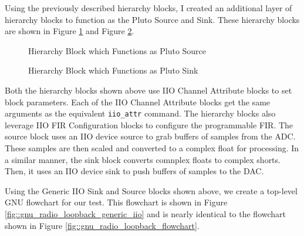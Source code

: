 \documentclass{article}
\begin{document}
Using the previously described hierarchy blocks, I created an additional layer of hierarchy blocks to function as the Pluto Source and Sink. These hierarchy blocks are shown in Figure \ref{fig::pluto_iio_device_source} and Figure \ref{fig::pluto_iio_device_sink}.

\begin{figure}[H]
	\centerline{}
	\caption{Hierarchy Block which Functions as Pluto Source}
	\label{fig::pluto_iio_device_source}
\end{figure}

\begin{figure}[H]
	\centerline{}
	\caption{Hierarchy Block which Functions as Pluto Sink}
	\label{fig::pluto_iio_device_sink}
\end{figure}

Both the hierarchy blocks shown above use IIO Channel Attribute blocks to set block parameters. Each of the IIO Channel Attribute blocks get the same arguments as the equivalent \texttt{iio\_attr} command. The hierarchy blocks also leverage IIO FIR Configuration blocks to configure the programmable FIR. The source block uses an IIO device source to grab buffers of samples from the ADC. These samples are then scaled and converted to a complex float for processing. In a similar manner, the sink block converts comnplex floats to complex shorts. Then, it uses an IIO device sink to push buffers of samples to the DAC. 

Using the Generic IIO Sink and Source blocks shown above, we create a top-level GNU flowchart for our test. This flowchart is shown in Figure \ref{fig::gnu_radio_loopback_generic_iio} and is nearly identical to the flowchart shown in Figure \ref{fig::gnu_radio_loopback_flowchart}.
\end{document}
